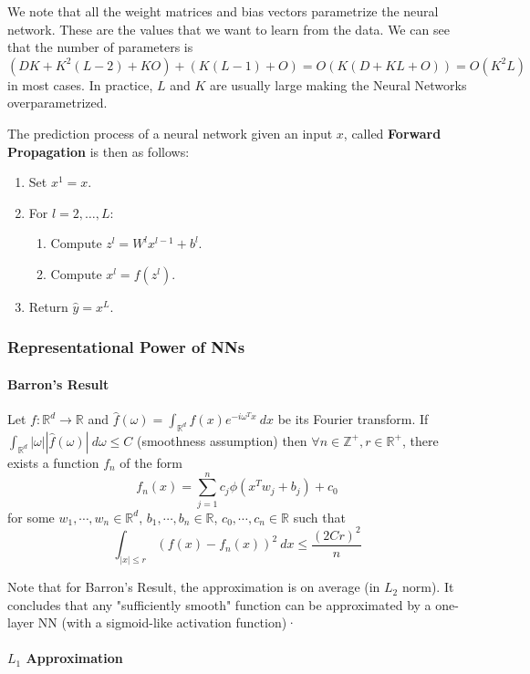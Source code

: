 \documentclass{article}
\newcommand{\R}{\mathbb{R}}
\newcommand{\Z}{\mathbb{Z}}
\begin{document}
We note that all the weight matrices and bias vectors parametrize the neural network.
These are the values that we want to learn from the data.
We can see that the number of parameters is $(DK + K^2(L-2) + KO) + (K(L-1) + O) = O(K(D + KL + O)) = O(K^2L)$ in most cases.
In practice, $L$ and $K$ are usually large making the Neural Networks overparametrized.

The prediction process of a neural network given an input $x$, called \textbf{Forward Propagation} is then as follows:
\begin{enumerate}
    \item Set $x^1 = x$.
    \item For $l = 2, \dots, L$:
    \begin{enumerate}
	\item Compute $z^l = W^l x^{l-1} + b^l$.
	\item Compute $x^l = f(z^l)$.
    \end{enumerate}
    \item Return $\hat{y} = x^L$.
\end{enumerate}

\subsubsection{Representational Power of NNs}

\paragraph{Barron's Result}

Let $f : \R^d \to \R$ and $\hat{f}(\omega) = \int_{\R^d} f(x) e^{-i\omega^Tx} \ dx$ be its Fourier transform.
If $\int_{\R^d} |\omega| |\hat{f}(\omega)| \ d \omega \leq C$ (smoothness assumption) then $\forall n \in \Z^+, r \in \R^+$, there exists a function $f_n$ of the form
$$
f_n(x) = \sum_{j=1}^n c_j \phi(x^T w_j + b_j) + c_0
$$
for some $w_1, \cdots, w_n \in \R^d$, $b_1, \cdots, b_n \in \R$, $c_0, \cdots, c_n \in \R$ such that
$$
\int_{|x| \leq r} (f(x) - f_n(x))^2 \ dx \leq \frac{(2Cr)^2}{n}
$$

Note that for Barron's Result, the approximation is on average (in $L_2$ norm).
It concludes that any "sufficiently smooth" function can be approximated by a one-layer NN (with a sigmoid-like activation function)·

\paragraph{$L_1$ Approximation}
\end{document}
